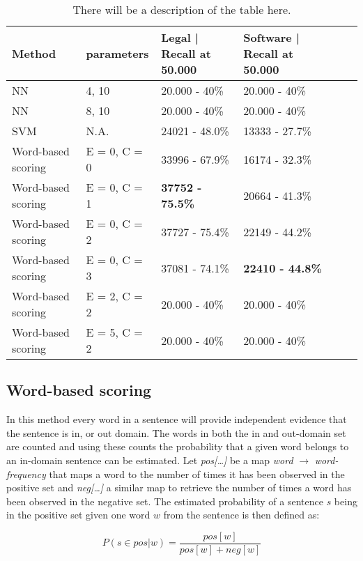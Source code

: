 \documentclass[11pt]{article}
\begin{document}
\begin{table*}[t]
    \begin{tabular}{|l|l|l|l|l|l|}
    \hline
    Method & parameters & Legal | Recall at 50.000  & Software | Recall at 50.000 \\ \hline
    NN      & 4, 10          & 20.000 - 40\%  & 20.000 - 40\%        \\ \hline
    NN      & 8, 10          & 20.000 - 40\%  & 20.000 - 40\%        \\ \hline
    SVM      & N.A.          & 24021 - 48.0\%  & 13333 - 27.7\%        \\ \hline
    Word-based scoring  & E = 0, C = 0 & 33996 - 67.9\%  & 16174 - 32.3\%        \\ \hline
    Word-based scoring  & E = 0, C = 1 & \textbf{37752 - 75.5\%}  & 20664 - 41.3\%        \\ \hline
    Word-based scoring  & E = 0, C = 2 & 37727 - 75.4\%  & 22149 - 44.2\%        \\ \hline
    Word-based scoring  & E = 0, C = 3 & 37081 - 74.1\%  & \textbf{22410 - 44.8\%}        \\ \hline
    Word-based scoring  & E = 2, C = 2 & 20.000 - 40\%  & 20.000 - 40\%        \\ \hline
    Word-based scoring  & E = 5, C = 2 & 20.000 - 40\%  & 20.000 - 40\%        \\ \hline
    \end{tabular}
    \caption{There will be a description of the table here.}
\end{table*}


\subsection{Word-based scoring}
\label{wbs}
In this method every word in a sentence will provide independent evidence that the sentence is in, or out domain. The words in both the in and out-domain set are counted and using these counts the probability that a given word belongs to an in-domain sentence can be estimated. Let \textit{pos[\dots]} be a map \textit{word} $\rightarrow$ \textit{word-frequency} that maps a word to the number of times it has been observed in the positive set and \textit{neg[\dots]} a similar map to retrieve the number of times a word has been observed in the negative set.
The estimated probability of a sentence $s$ being in the positive set given one word $w$ from the sentence is then defined as:

\begin{equation} \label{eq:simple}
P(s\in pos | w) = \frac{pos[w]}{pos[w] + neg[w]}
\end{equation}
\end{document}
